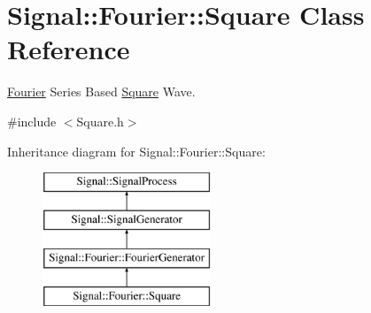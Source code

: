 \hypertarget{classSignal_1_1Fourier_1_1Square}{\section{Signal\+:\+:Fourier\+:\+:Square Class Reference}
\label{classSignal_1_1Fourier_1_1Square}
}


\hyperlink{namespaceSignal_1_1Fourier}{Fourier} Series Based \hyperlink{classSignal_1_1Fourier_1_1Square}{Square} Wave.  




{\ttfamily \#include $<$Square.\+h$>$}

Inheritance diagram for Signal\+:\+:Fourier\+:\+:Square\+:\begin{figure}[H]
\begin{center}
\leavevmode
\includegraphics[height=4.000000cm]{classSignal_1_1Fourier_1_1Square}
\end{center}
\end{figure}
